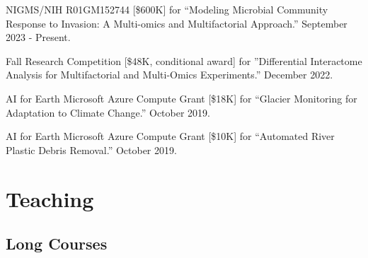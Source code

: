 \documentclass[letterpaper]{article}
\renewenvironment{itemize}{
  \begin{list}{}{
    \setlength{\leftmargin}{1.5em}
  }
}{
  \end{list}
}
\begin{document}
\begin{itemize}
\item NIGMS/NIH R01GM152744 [\$600K] for ``Modeling Microbial Community Response to Invasion: A Multi-omics and
Multifactorial Approach.'' September 2023 - Present.
\item Fall Research Competition [\$48K, conditional award]
for ''Differential Interactome Analysis for Multifactorial and Multi-Omics
Experiments.'' December 2022.
\item AI for Earth Microsoft Azure Compute Grant [\$18K] for
``Glacier Monitoring for Adaptation to Climate Change.'' October 2019. \\
\item AI for Earth Microsoft Azure Compute Grant [\$10K] for
``Automated River Plastic Debris Removal.'' October 2019.
\end{itemize}

\section*{Teaching}

\subsection*{Long Courses}
\end{document}
